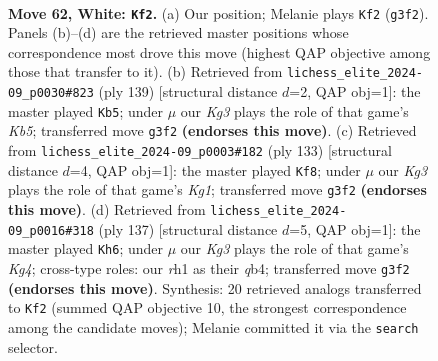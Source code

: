 \documentclass[11pt]{article}
\begin{document}
\clearpage

\begin{figure}[p]\centering
\begin{subfigure}{0.46\textwidth}\centering
\resizebox{\linewidth}{!}{%
\newchessgame
\chessboard[
  setfen={8/8/2pp4/p4k2/8/6K1/8/7r w - - 2 62},
  showmover=false,
  pgfstyle=straightmove, color=movearrow, markmove={g3-f2}
]}
\caption{}
\end{subfigure}\hfill
\begin{subfigure}{0.46\textwidth}\centering
\resizebox{\linewidth}{!}{%
\newchessgame
\chessboard[
  setfen={8/5P2/8/3P2Pp/1k6/3K4/8/2R5 b - - 0 70},
  showmover=false,
  pgfstyle=straightmove, color=movearrow, markmove={b4-b5}
]}
\caption{}
\end{subfigure}
\\[4pt]
\begin{subfigure}{0.46\textwidth}\centering
\resizebox{\linewidth}{!}{%
\newchessgame
\chessboard[
  setfen={6k1/3R4/6K1/8/4p3/4P2P/8/8 b - - 1 67},
  showmover=false,
  pgfstyle=straightmove, color=movearrow, markmove={g8-f8}
]}
\caption{}
\end{subfigure}\hfill
\begin{subfigure}{0.46\textwidth}\centering
\resizebox{\linewidth}{!}{%
\newchessgame
\chessboard[
  setfen={8/5P2/P7/3K2k1/1Q6/8/8/8 b - - 0 69},
  showmover=false,
  pgfstyle=straightmove, color=movearrow, markmove={g5-h6}
]}
\caption{}
\end{subfigure}
\caption{\textbf{Move 62, White: \texttt{Kf2}.} (a) Our position; Melanie plays \texttt{Kf2} (\texttt{g3f2}). Panels (b)--(d) are the retrieved master positions whose correspondence most drove this move (highest QAP objective among those that transfer to it). (b) Retrieved from \texttt{lichess\_elite\_2024-09\_p0030\#823} (ply 139) [structural distance $d$=2, QAP obj=1]: the master played \texttt{Kb5}; under $\mu$ our \emph{Kg3} plays the role of that game's \emph{Kb5}; transferred move \texttt{g3f2} \textbf{(endorses this move)}. (c) Retrieved from \texttt{lichess\_elite\_2024-09\_p0003\#182} (ply 133) [structural distance $d$=4, QAP obj=1]: the master played \texttt{Kf8}; under $\mu$ our \emph{Kg3} plays the role of that game's \emph{Kg1}; transferred move \texttt{g3f2} \textbf{(endorses this move)}. (d) Retrieved from \texttt{lichess\_elite\_2024-09\_p0016\#318} (ply 137) [structural distance $d$=5, QAP obj=1]: the master played \texttt{Kh6}; under $\mu$ our \emph{Kg3} plays the role of that game's \emph{Kg4}; cross-type roles: our \emph{r}h1 as their \emph{q}b4; transferred move \texttt{g3f2} \textbf{(endorses this move)}. Synthesis: 20 retrieved analogs transferred to \texttt{Kf2} (summed QAP objective 10, the strongest correspondence among the candidate moves); Melanie committed it via the \texttt{search} selector.}
\label{fig:thought-m122}
\end{figure}
\end{document}
